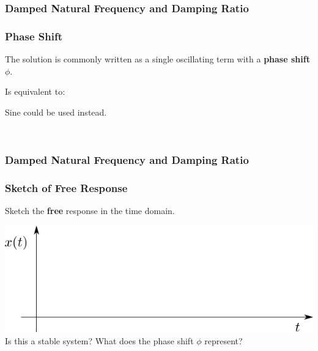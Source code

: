 \documentclass[fleqn]{beamer} %
\newcommand{\sectionIIsubsectionItitle}{Damped Natural Frequency and Damping Ratio}
\begin{document}
			\begin{frame}[label=sectionIIsubsectionI]
				\frametitle{\sectionIIsubsectionItitle}
				\bigskip

				\frametitle{Phase Shift}

				\large The solution is commonly written as a single oscillating term with a {\bf phase shift} $\phi$.\vspc

					 \vspc

				\large Is equivalent to: \vspc

					 \vspc

				\large Sine could be used instead.\vspc

				 \\

				
				\btVFill
			\end{frame}

			\begin{frame}[label=sectionIIsubsectionI]
				\frametitle{\sectionIIsubsectionItitle}
				\bigskip

				\frametitle{Sketch of Free Response}

				\large Sketch the {\bf free} response in the time domain.  \vspc

				  \vspc
				  \vspc

				\includegraphics[scale=0.5]{images/lecture2_fig2.png} \\

				\large Is this a stable system? What does the phase shift $\phi$ represent? \\

				
				\btVFill
			\end{frame}
\end{document}
